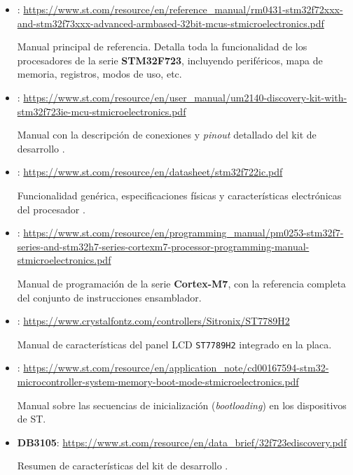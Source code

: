 \documentclass[../main.tex]{subfiles}
\begin{document}
        \begin{itemize}
            \item \REFMAN : \url{https://www.st.com/resource/en/reference_manual/rm0431-stm32f72xxx-and-stm32f73xxx-advanced-armbased-32bit-mcus-stmicroelectronics.pdf}
            
                Manual principal de referencia. Detalla toda la funcionalidad de los procesadores de la serie \textbf{STM32F723}, incluyendo periféricos, mapa de memoria, registros, modos de uso, etc.

            \item \BRDMAN : \url{https://www.st.com/resource/en/user_manual/um2140-discovery-kit-with-stm32f723ie-mcu-stmicroelectronics.pdf}
            
                Manual con la descripción de conexiones y \textit{pinout} detallado del kit de desarrollo \BOARD.

            \item \DSMAN : \url{https://www.st.com/resource/en/datasheet/stm32f722ic.pdf}

                Funcionalidad genérica, especificaciones físicas y características electrónicas del procesador \MCU.
            
            \item \PMMAN : \url{https://www.st.com/resource/en/programming_manual/pm0253-stm32f7-series-and-stm32h7-series-cortexm7-processor-programming-manual-stmicroelectronics.pdf}
            
                Manual de programación de la serie \textbf{Cortex-M7}, con la referencia completa del conjunto de instrucciones ensamblador.

            \item \LCDMAN : \url{https://www.crystalfontz.com/controllers/Sitronix/ST7789H2}
            
                Manual de características del panel LCD \texttt{ST7789H2} integrado en la placa.
            
            \item \ANMAN : \url{https://www.st.com/resource/en/application_note/cd00167594-stm32-microcontroller-system-memory-boot-mode-stmicroelectronics.pdf}
            
                Manual sobre las secuencias de inicialización (\emph{bootloading}) en los dispositivos de ST.

            \item \textbf{DB3105}: \url{https://www.st.com/resource/en/data_brief/32f723ediscovery.pdf}

                Resumen de características del kit de desarrollo \BOARD.    
        \end{itemize}
\end{document}
